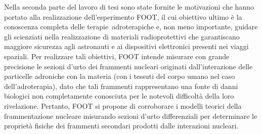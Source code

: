 \documentclass[12pt,a4paper,twoside]{report}
\begin{document}
	Nella seconda parte del lavoro di tesi sono state fornite le motivazioni che hanno portato alla realizzazione dell'esperimento FOOT, il cui obiettivo ultimo è la conoscenza completa delle terapie adroterapiche e, non meno importante, guidare gli scienziati nella realizzazione di materiali radioprotettivi che garantiscano maggiore sicurezza agli astronauti e ai dispositivi elettronici presenti nei viaggi spaziali. Per realizzare tali obiettivi, FOOT intende misurare con grande precisione le sezioni d'urto dei frammenti nucleari originati dall'interazione delle particelle adroniche con la materia (con i tessuti del corpo umano nel caso dell'adroterapia), dato che tali frammenti rappresentano una fonte di danni biologici non completamente conosciuta per le notevoli difficoltà della loro rivelazione. Pertanto, FOOT si propone di corroborare i modelli teorici della frammentazione nucleare misurando sezioni d'urto differenziali per determinare le proprietà fisiche dei frammenti secondari prodotti dalle interazioni nucleari.
	
\end{document}
